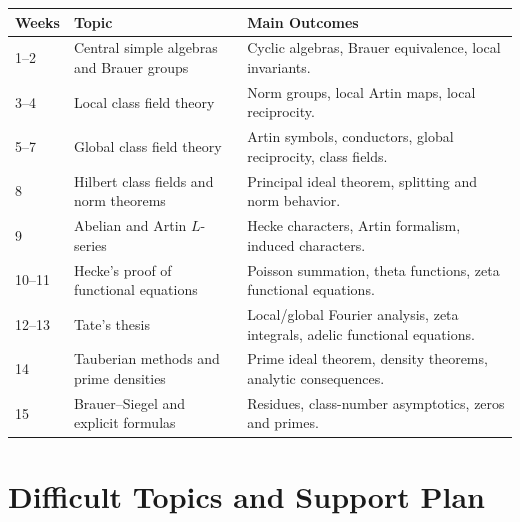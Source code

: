 \documentclass[11pt]{article}
\begin{document}
\begin{longtable}{p{}p{}p{}}
\toprule
\textbf{Weeks} & \textbf{Topic} & \textbf{Main Outcomes} \\
\midrule
\endhead

1--2 &
Central simple algebras and Brauer groups &
Cyclic algebras, Brauer equivalence, local invariants. \\

3--4 &
Local class field theory &
Norm groups, local Artin maps, local reciprocity. \\

5--7 &
Global class field theory &
Artin symbols, conductors, global reciprocity, class fields. \\

8 &
Hilbert class fields and norm theorems &
Principal ideal theorem, splitting and norm behavior. \\

9 &
Abelian and Artin $L$-series &
Hecke characters, Artin formalism, induced characters. \\

10--11 &
Hecke's proof of functional equations &
Poisson summation, theta functions, zeta functional equations. \\

12--13 &
Tate's thesis &
Local/global Fourier analysis, zeta integrals, adelic functional equations. \\

14 &
Tauberian methods and prime densities &
Prime ideal theorem, density theorems, analytic consequences. \\

15 &
Brauer--Siegel and explicit formulas &
Residues, class-number asymptotics, zeros and primes. \\
\bottomrule
\end{longtable}

\section{Difficult Topics and Support Plan}
\end{document}

